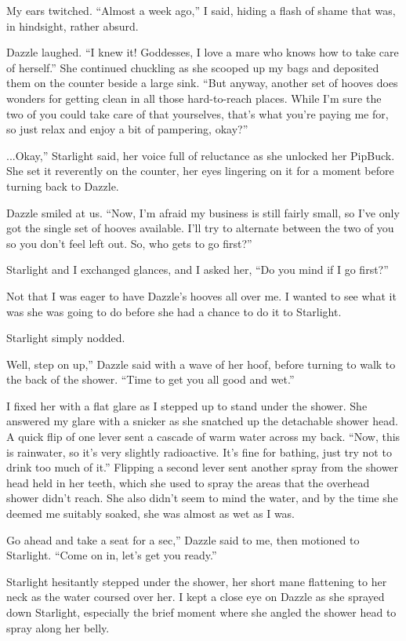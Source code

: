 My ears twitched. “Almost a week ago,” I said, hiding a flash of shame that was, in hindsight, rather absurd.

Dazzle laughed. “I knew it! Goddesses, I love a mare who knows how to take care of herself.” She continued chuckling as she scooped up my bags and deposited them on the counter beside a large sink. “But anyway, another set of hooves does wonders for getting clean in all those hard-to-reach places. While I’m sure the two of you could take care of that yourselves, that’s what you’re paying me for, so just relax and enjoy a bit of pampering, okay?”

\leavevmode{}...Okay,” Starlight said, her voice full of reluctance as she unlocked her PipBuck. She set it reverently on the counter, her eyes lingering on it for a moment before turning back to Dazzle.

Dazzle smiled at us. “Now, I’m afraid my business is still fairly small, so I’ve only got the single set of hooves available. I’ll try to alternate between the two of you so you don’t feel left out. So, who gets to go first?”

Starlight and I exchanged glances, and I asked her, “Do you mind if I go first?”

Not that I was eager to have Dazzle’s hooves all over me. I wanted to see what it was she was going to do before she had a chance to do it to Starlight.

Starlight simply nodded.

\leavevmode{}Well, step on up,” Dazzle said with a wave of her hoof, before turning to walk to the back of the shower. “Time to get you all good and wet.”

I fixed her with a flat glare as I stepped up to stand under the shower. She answered my glare with a snicker as she snatched up the detachable shower head. A quick flip of one lever sent a cascade of warm water across my back. “Now, this is rainwater, so it’s very slightly radioactive. It’s fine for bathing, just try not to drink too much of it.” Flipping a second lever sent another spray from the shower head held in her teeth, which she used to spray the areas that the overhead shower didn’t reach. She also didn’t seem to mind the water, and by the time she deemed me suitably soaked, she was almost as wet as I was.

\leavevmode{}Go ahead and take a seat for a sec,” Dazzle said to me, then motioned to Starlight. “Come on in, let’s get you ready.”

Starlight hesitantly stepped under the shower, her short mane flattening to her neck as the water coursed over her. I kept a close eye on Dazzle as she sprayed down Starlight, especially the brief moment where she angled the shower head to spray along her belly.

